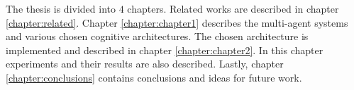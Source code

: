 The thesis is divided into $4$ chapters.
Related works are described in chapter \ref{chapter:related}.
Chapter \ref{chapter:chapter1} describes the multi-agent systems and various chosen cognitive architectures.
The chosen architecture is implemented and described in chapter \ref{chapter:chapter2}.
In this chapter experiments and their results are also described.
Lastly, chapter \ref{chapter:conclusions} contains conclusions and ideas for future work.



